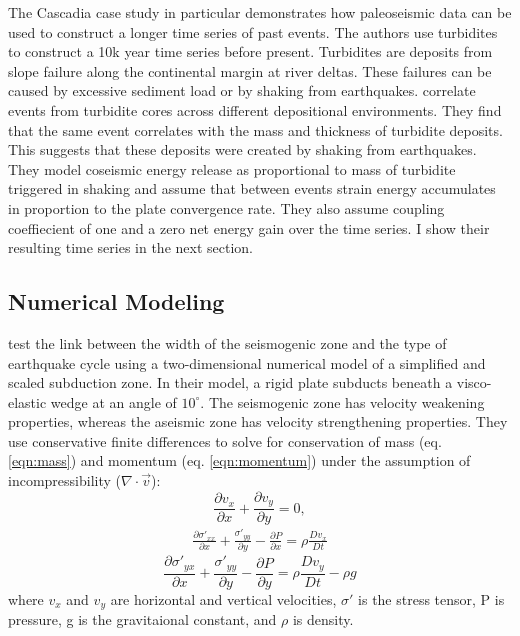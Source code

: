 \documentclass[]{proposalnsf}
\begin{document}
 The Cascadia case study in particular demonstrates how paleoseismic data can be used to construct a longer time series of past events. The authors use turbidites to construct a 10k year time series before present. Turbidites are deposits from slope failure along the continental margin at river deltas. These failures can be caused by excessive sediment load or by shaking from earthquakes. \citet{Goldfinger2013} correlate events from turbidite cores across different depositional environments. They find that the same event correlates with the mass and thickness of turbidite deposits. This suggests that these deposits were created by shaking from earthquakes. They model coseismic energy release as proportional to mass of turbidite triggered in shaking and assume that between events strain energy accumulates in proportion to the plate convergence rate. They also assume coupling coeffiecient of one and a zero net energy gain over the time series. I show their resulting time series in the next section. 

\subsection{Numerical Modeling}

\citet{Herrendorfer2015} test the link between the width of the seismogenic zone and the type of earthquake cycle using a two-dimensional numerical model of a simplified and scaled subduction zone. In their model, a rigid plate subducts beneath a visco-elastic wedge at an angle of $10^\circ$. The seismogenic zone has velocity weakening properties, whereas the aseismic zone has velocity strengthening properties. They use conservative finite differences to solve for conservation of mass (eq. \ref{eqn:mass}) and momentum (eq. \ref{eqn:momentum}) under the assumption of incompressibility ($\nabla \cdot \vec{v}$):
\begin{equation}
	\frac{\partial v_x}{\partial x} + \frac{\partial v_y}{\partial y} = 0,
	\label{eqn:mass}
\end{equation}
\begin{eqnarray}
\frac{\partial \sigma'_{xx}}{\partial x} + \frac{\sigma'_{yy}}{\partial y} - \frac{\partial P}{\partial x} = \rho\frac{Dv_x}{Dt} \nonumber 
\end{eqnarray}
%
\begin{equation}
	\frac{\partial \sigma'_{yx}}{\partial x} + \frac{\sigma'_{yy}}{\partial y} - \frac{\partial P}{\partial y} = \rho\frac{Dv_y}{Dt} - \rho g
	\label{eqn:momentum}
\end{equation}
%
where $v_x$ and $v_y$ are horizontal and vertical velocities, $\sigma'$ is the stress tensor, P is pressure, g is the gravitaional constant, and $\rho$ is density. 
\end{document}

